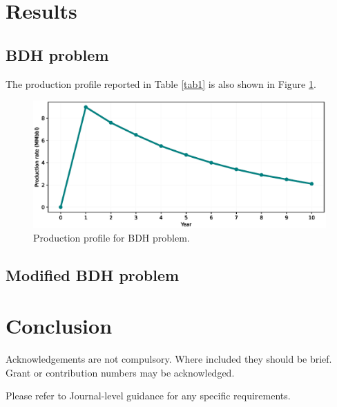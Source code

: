 \documentclass[pdflatex,sn-basic]{sn-jnl}%
\theoremstyle{thmstyleone}%
\theoremstyle{thmstyletwo}%
\theoremstyle{thmstylethree}%
\begin{document}
\section{Results}\label{sec5}

\subsection{BDH problem}\label{subsec51}

The production profile reported in Table \ref{tab1} is also shown in Figure \ref{fig11}.

\begin{figure}[H]
\centering
\begin{minipage}{0.95\textwidth}
  \includegraphics[width=\textwidth]{prod_profile.eps}
  \caption{Production profile for BDH problem.}
  \label{fig11}
\end{minipage}
\end{figure}

\subsection{Modified BDH problem}\label{subsec52}

\section{Conclusion}\label{sec6}




Acknowledgements are not compulsory. Where included they should be brief. Grant or contribution numbers may be acknowledged.

Please refer to Journal-level guidance for any specific requirements.






\end{document}
